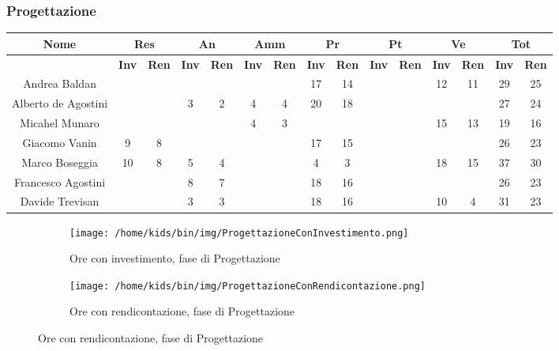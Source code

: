 \documentclass{scalatekids-article}
\begin{document}
\subsubsection{Progettazione}
\begin{tabular}{| c | c  c | c  c | c  c | c  c | c  c | c  c | c  c |}
  \hline
  \textbf{Nome} & \multicolumn{2}{|c|}{\textbf{Res}} & \multicolumn{2}{|c|}{\textbf{An}} & \multicolumn{2}{|c|}{\textbf{Amm}} & \multicolumn{2}{|c|}{\textbf{Pr}} & \multicolumn{2}{|c|}{\textbf{Pt}} & \multicolumn{2}{|c|}{\textbf{Ve}} & \multicolumn{2}{|c|}{\textbf{Tot}}\\
  \hline
  & \textbf{Inv} & \textbf{Ren} & \textbf{Inv} & \textbf{Ren} & \textbf{Inv} & \textbf{Ren} & \textbf{Inv} & \textbf{Ren} & \textbf{Inv} & \textbf{Ren} & \textbf{Inv} & \textbf{Ren} & \textbf{Inv} & \textbf{Ren}\\
  \hline
  Andrea Baldan & & & & & & & 17 & 14 & & & 12 & 11 & 29 & 25\\
  Alberto de Agostini & & & 3 & 2 & 4 & 4 & 20 & 18 & & & & & 27 & 24\\
  Micahel Munaro & & & & & 4 & 3 & & & & & 15 & 13 & 19 & 16\\
  Giacomo Vanin & 9 & 8 & & & & & 17 & 15 & & & & & 26 & 23\\
  Marco Boseggia & 10 & 8 & 5 & 4 & & & 4 & 3 & & & 18 & 15 & 37 & 30\\
  Francesco Agostini & & & 8 & 7 & & & 18 & 16 & & & & & 26 & 23\\
  Davide Trevisan & & & 3 & 3 & & & 18 & 16 & & & 10 & 4 & 31 & 23\\
  \hline
\end{tabular}
\begin{figure}[H]
  \begin{subfigure}[H]{0.47\textwidth}
    \texttt{[image: /home/kids/bin/img/ProgettazioneConInvestimento.png]}
    \caption{Ore con investimento, fase di Progettazione}
  \end{subfigure}
  \qquad
  \begin{subfigure}[H]{0.47\textwidth}
    \texttt{[image: /home/kids/bin/img/ProgettazioneConRendicontazione.png]}
    \caption{Ore con rendicontazione, fase di Progettazione}
  \end{subfigure}
\end{figure}
\end{document}
